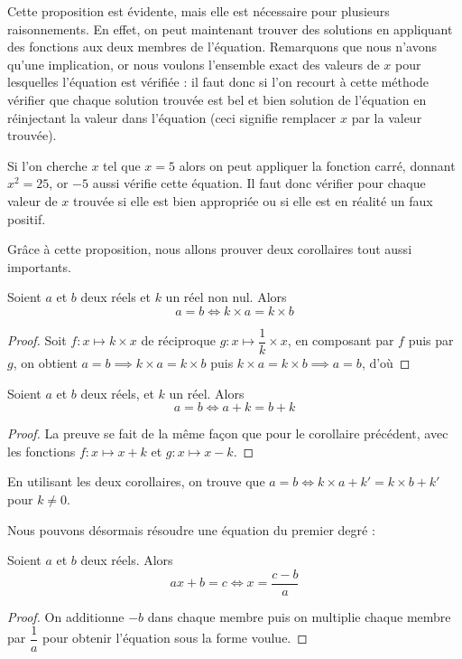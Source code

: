 Cette proposition est évidente, mais elle est nécessaire pour plusieurs raisonnements. En effet, on peut maintenant trouver des solutions en appliquant des fonctions aux deux membres de l'équation. Remarquons que nous n'avons qu'une implication, or nous voulons l'ensemble exact des valeurs de $x$ pour lesquelles l'équation est vérifiée : il faut donc si l'on recourt à cette méthode vérifier que chaque solution trouvée est bel et bien solution de l'équation en réinjectant la valeur dans l'équation (ceci signifie remplacer $x$ par la valeur trouvée).

\begin{expl}
    Si l'on cherche $x$ tel que $x=5$ alors on peut appliquer la fonction carré, donnant $x^2=25$, or $-5$ aussi vérifie cette équation. Il faut donc vérifier pour chaque valeur de $x$ trouvée si elle est bien appropriée ou si elle est en réalité un \og faux positif\fg{}.
\end{expl}

Grâce à cette proposition, nous allons prouver deux corollaires tout aussi importants.

\begin{cor}
    Soient $a$ et $b$ deux réels et $k$ un réel non nul. Alors $$a=b\iff k\times a = k\times b$$
\end{cor}
\begin{proof}
    Soit $f : x \mapsto k\times x$ de réciproque $g : x \mapsto \dfrac{1}{k}\times x$, en composant par $f$ puis par $g$, on obtient $a=b\implies k\times a = k\times b$ puis $k\times a = k\times b\implies a=b$, d'où 
\end{proof}

\begin{cor}
    Soient $a$ et $b$ deux réels, et $k$ un réel. Alors $$a=b \iff a+k=b+k$$
\end{cor}
\begin{proof}
    La preuve se fait de la même façon que pour le corollaire précédent, avec les fonctions $f : x \mapsto x + k$ et $g : x\mapsto x-k$.
\end{proof}

\begin{rmk}
    En utilisant les deux corollaires, on trouve que $a=b\iff k\times a + k' = k\times b + k'$ pour $k\neq 0$.
\end{rmk}

Nous pouvons désormais résoudre une équation du premier degré :

\begin{them}
    Soient $a$ et $b$ deux réels. Alors $$ax+b=c\iff x = \dfrac{c-b}{a}$$
\end{them}
\begin{proof}
    On additionne $-b$ dans chaque membre puis on multiplie chaque membre par $\dfrac{1}{a}$ pour obtenir l'équation sous la forme voulue.
\end{proof}

